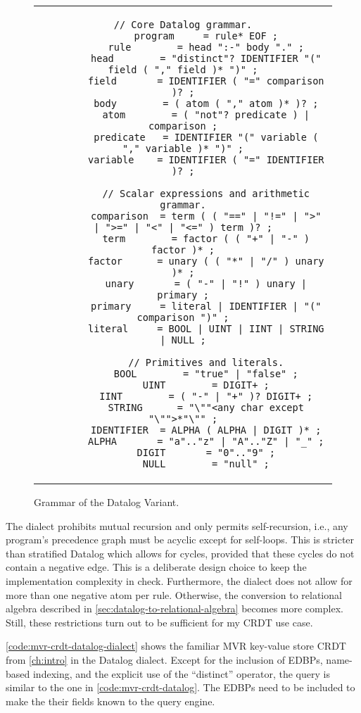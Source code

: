 \begin{figure}[htpb]
	\centering
	\begin{tabular}{c}
		\begin{lstlisting}[keepspaces]
		// Core Datalog grammar.
		program     = rule* EOF ;
        rule        = head ":-" body "." ;
        head        = "distinct"? IDENTIFIER "(" field ( "," field )* ")" ;
        field       = IDENTIFIER ( "=" comparison )? ;
        body        = ( atom ( "," atom )* )? ;
        atom        = ( "not"? predicate ) | comparison ;
        predicate   = IDENTIFIER "(" variable ( "," variable )* ")" ;
        variable    = IDENTIFIER ( "=" IDENTIFIER )? ;

        // Scalar expressions and arithmetic grammar.
		comparison  = term ( ( "==" | "!=" | ">" | ">=" | "<" | "<=" ) term )? ;
		term        = factor ( ( "+" | "-" ) factor )* ;
		factor      = unary ( ( "*" | "/" ) unary )* ;
		unary       = ( "-" | "!" ) unary | primary ;
		primary     = literal | IDENTIFIER | "(" comparison ")" ;
		literal     = BOOL | UINT | IINT | STRING | NULL ;

		// Primitives and literals.
		BOOL        = "true" | "false" ;
		UINT        = DIGIT+ ;
		IINT        = ( "-" | "+" )? DIGIT+ ;
		STRING      = "\""<any char except "\"">*"\"" ;
		IDENTIFIER  = ALPHA ( ALPHA | DIGIT )* ;
		ALPHA       = "a".."z" | "A".."Z" | "_" ;
		DIGIT       = "0".."9" ;
		NULL        = "null" ;
        \end{lstlisting}
	\end{tabular}
	\caption{Grammar of the Datalog Variant.}\label{code:datalog-grammar}
\end{figure}

The dialect prohibits mutual recursion and only permits self-recursion, i.e.,
any program's precedence graph must be acyclic except for self-loops.
This is stricter than stratified Datalog which allows for cycles,
provided that these cycles do not contain a negative edge.
This is a deliberate design choice to keep the implementation complexity in check.
Furthermore, the dialect does not allow for more than one negative atom per rule.
Otherwise, the conversion to relational algebra described in
\ref{sec:datalog-to-relational-algebra} becomes more complex.
Still, these restrictions turn out to be sufficient for my \ac{CRDT} use case.

\ref{code:mvr-crdt-datalog-dialect} shows the familiar \ac{MVR} key-value store
\ac{CRDT} from \ref{ch:intro} in the Datalog dialect.
Except for the inclusion of \acp{EDBP}, name-based indexing, and the explicit
use of the ``distinct'' operator, the query is similar to the one
in \ref{code:mvr-crdt-datalog}.
The \acp{EDBP} need to be included to make the their fields known to the
query engine.

